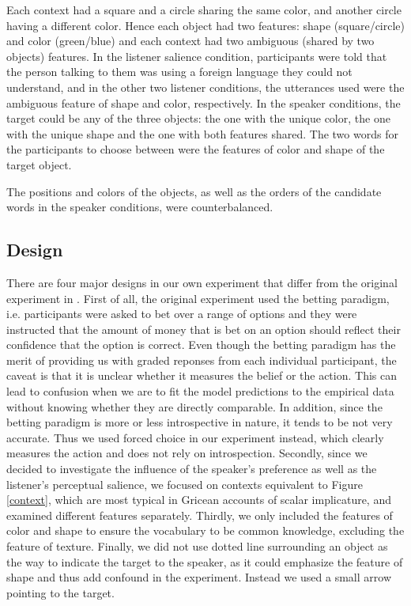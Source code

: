 Each context had a square and a circle sharing the same color, and another circle having a different color. Hence each object had two features: shape (square/circle) and color (green/blue) and each context had two ambiguous (shared by two objects) features. In the listener salience condition, participants were told that the person talking to them was using a foreign language they could not understand, and in the other two listener conditions, the utterances used were the ambiguous feature of shape and color, respectively. In the speaker conditions, the target could be any of the three objects: the one with the unique color, the one with the unique shape and the one with both features shared. The two words for the participants to choose between were the features of color and shape of the target object.

The positions and colors of the objects, as well as the orders of the candidate words in the speaker conditions, were counterbalanced. 

\subsection*{Design}

There are four major designs in our own experiment that differ from the original experiment in \cite{Frank}. First of all, the original experiment used the betting paradigm, i.e. participants were asked to bet over a range of options and they were instructed that the amount of money that is bet on an option should reflect their confidence that the option is correct. Even though the betting paradigm has the merit of providing us with graded reponses from each individual participant, the caveat is that it is unclear whether it measures the belief or the action. This can lead to confusion when we are to fit the model predictions to the empirical data without knowing whether they are directly comparable. In addition, since the betting paradigm is more or less introspective in nature, it tends to be not very accurate. Thus we used forced choice in our experiment instead, which clearly measures the action and does not rely on introspection.
Secondly, since we decided to investigate the influence of the speaker's preference as well as the listener's perceptual salience, we focused on contexts equivalent to Figure \ref{context}, which are most typical in Gricean accounts of scalar implicature, and examined different features separately.
Thirdly, we only included the features of color and shape to ensure the vocabulary to be common knowledge, excluding the feature of texture. Finally, we did not use dotted line surrounding an object as the way to indicate the target to the speaker, as it could emphasize the feature of shape and thus add confound in the experiment. Instead we used a small arrow pointing to the target. 

